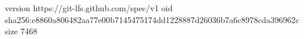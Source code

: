 version https://git-lfs.github.com/spec/v1
oid sha256:e8860a806482aa77e00b7145475174dd1228887d26036b7a6c8978cda396962c
size 7468
